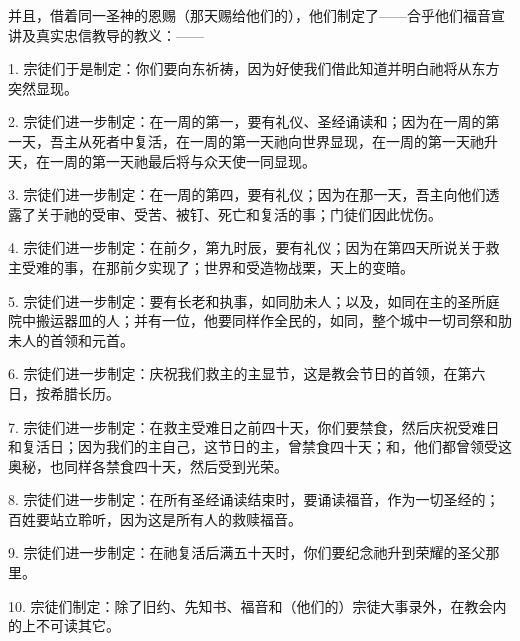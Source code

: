 并且，借着同一圣神的恩赐（那天赐给他们的），他们制定了——合乎他们福音宣讲及真实忠信教导的教义：——\par

1. 宗徒们于是制定：你们要向东祈祷，因为好使我们借此知道并明白祂将从东方突然显现。\par

2. 宗徒们进一步制定：在一周的第一，要有礼仪、圣经诵读和；因为在一周的第一天，吾主从死者中复活，在一周的第一天祂向世界显现，在一周的第一天祂升天，在一周的第一天祂最后将与众天使一同显现。\par

3. 宗徒们进一步制定：在一周的第四，要有礼仪；因为在那一天，吾主向他们透露了关于祂的受审、受苦、被钉、死亡和复活的事；门徒们因此忧伤。\par

4. 宗徒们进一步制定：在前夕，第九时辰，要有礼仪；因为在第四天所说关于救主受难的事，在那前夕实现了；世界和受造物战栗，天上的变暗。\par

5. 宗徒们进一步制定：要有长老和执事，如同肋未人；以及，如同在主的圣所庭院中搬运器皿的人；并有一位，他要同样作全民的，如同，整个城中一切司祭和肋未人的首领和元首。\par

6. 宗徒们进一步制定：庆祝我们救主的主显节，这是教会节日的首领，在第六日，按希腊长历。\par

7. 宗徒们进一步制定：在救主受难日之前四十天，你们要禁食，然后庆祝受难日和复活日；因为我们的主自己，这节日的主，曾禁食四十天；和，他们都曾领受这奥秘，也同样各禁食四十天，然后受到光荣。\par

8. 宗徒们进一步制定：在所有圣经诵读结束时，要诵读福音，作为一切圣经的；百姓要站立聆听，因为这是所有人的救赎福音。\par

9. 宗徒们进一步制定：在祂复活后满五十天时，你们要纪念祂升到荣耀的圣父那里。\par

10. 宗徒们制定：除了旧约、先知书、福音和（他们的）宗徒大事录外，在教会内的上不可读其它。\par

